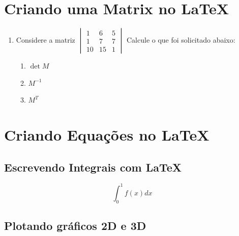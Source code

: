 \documentclass[a4paper,12pt]{article}
\begin{document}
\newpage


\section{Criando uma Matrix no \LaTeX}
\begin{enumerate}
\item Considere a matriz
$
\begin{vmatrix}
    1 & 6 & 5 \\
    1 & 7 & 7 \\
    10 & 15 & 1

\end{vmatrix}
$ Calcule o que foi solicitado abaixo:
\begin{enumerate}
    \item $\det M$
    \item $M^{-1}$
    \item $M^T$
\end{enumerate}

\end{enumerate}

\section{Criando Equações no \LaTeX}
\subsection{Escrevendo Integrais com \LaTeX}

\begin{equation}
    \int_0^1 f(x)dx
\end{equation}

\subsection{Plotando gráficos 2D e 3D}


\end{document}
